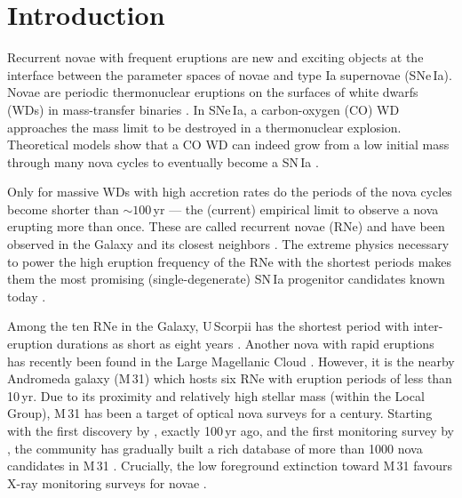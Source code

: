 \documentclass[twocolumn,tighten]{aastex6}
\def\m31{{M\,31}}
\newcommand{\nh}{\hbox{$N_{\rm H}$}~}
\newcommand{\hcm}[1]{$\times 10^{#1}$\,cm$^{-2}$}
\begin{document}

\section{Introduction}
Recurrent novae with frequent eruptions are new and exciting objects at the interface between the parameter spaces of novae and type Ia supernovae (SNe\,Ia). Novae are periodic thermonuclear eruptions on the surfaces of white dwarfs (WDs) in mass-transfer binaries \citep[see][for comprehensive reviews on nova physics]{2008clno.book.....B, Jos16,2016PASP..128e1001S}. In SNe\,Ia, a carbon-oxygen (CO) WD approaches the \citet{1931ApJ....74...81C} mass limit to be destroyed in a thermonuclear explosion. Theoretical models show that a CO WD can indeed grow from a low initial mass through many nova cycles to eventually become a SN\,Ia \citep[e.g.,][]{2005ApJ...623..398Y,2014ASPC..490..287N, 2016ApJ...819..168H}.

Only for massive WDs with high accretion rates do the periods of the nova cycles become shorter than $\sim100$\,yr \citep{1985ApJ...291..136S,2005ApJ...623..398Y,2008NewAR..52..386H,2014ApJ...793..136K} --- the (current) empirical limit to observe a nova erupting more than once. These are called recurrent novae (RNe) and have been observed in the Galaxy and its closest neighbors \citep[see, for example,][]{1991ApJ...370..193S,2010ApJS..187..275S,2015ApJS..216...34S,2016ApJ...818..145B}.  The extreme physics necessary to power the high eruption frequency of the RNe with the shortest periods makes them the most promising (single-degenerate) SN\,Ia progenitor candidates known today \citep{2015ApJ...808...52K}.

Among the ten RNe in the Galaxy, U\,Scorpii has the shortest period with inter-eruption durations as short as eight years \citep{2010ApJS..187..275S}. Another nova with rapid eruptions has recently been found in the Large Magellanic Cloud \citep[LMCN\,1968-12a with 5~yr;][]{2016ATel.8578....1M,2016ATel.8587....1D,KuinPaper}. However, it is the nearby Andromeda galaxy (\m31) which hosts six RNe with eruption periods of less than 10\,yr. Due to its proximity and relatively high stellar mass (within the Local Group), \m31 has been a target of optical nova surveys for a century. Starting with the first discovery by \citet{1917PASP...29..210R}, exactly 100\,yr ago, and the first monitoring survey by \citet{1929ApJ....69..103H}, the community has gradually built a rich database of more than 1000 nova candidates in \m31 \citep[see][and their on-line database\footnote{\url{http://www.mpe.mpg.de/~m31novae/opt/m31/index.php}}]{2007A&A...465..375P,2010AN....331..187P}. Crucially, the low foreground extinction toward \m31 \citep[\nh = 0.7\hcm{21},][]{1992ApJS...79...77S} favours X-ray monitoring surveys for novae \citep{2007A&A...465..375P,2010A&A...523A..89H,2011A&A...533A..52H,2014A&A...563A...2H}.
\end{document}
